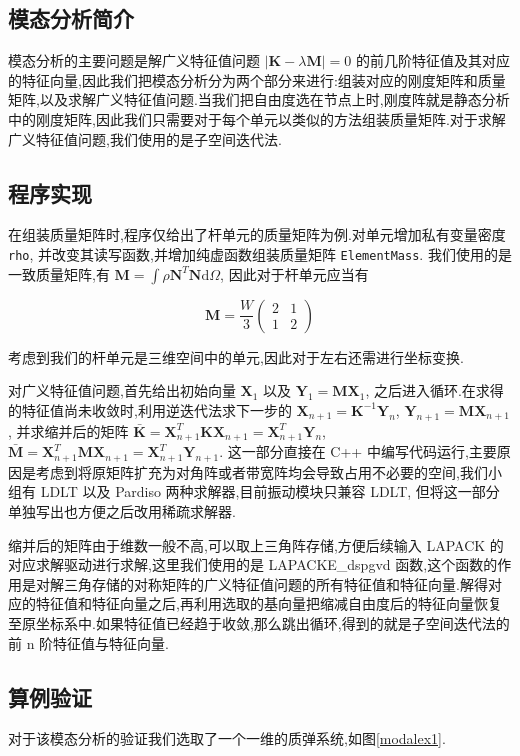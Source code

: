 
\subsection{模态分析简介}
模态分析的主要问题是解广义特征值问题 $|\mathbf{K}-\lambda\mathbf{M}|=0$ 的前几阶特征值及其对应的特征向量,因此我们把模态分析分为两个部分来进行:组装对应的刚度矩阵和质量矩阵,以及求解广义特征值问题.当我们把自由度选在节点上时,刚度阵就是静态分析中的刚度矩阵,因此我们只需要对于每个单元以类似的方法组装质量矩阵.对于求解广义特征值问题,我们使用的是子空间迭代法.
\subsection{程序实现}
在组装质量矩阵时,程序仅给出了杆单元的质量矩阵为例.对单元增加私有变量密度 \texttt{rho}, 并改变其读写函数,并增加纯虚函数组装质量矩阵 \texttt{ElementMass}. 我们使用的是一致质量矩阵,有 $\mathbf{M}=\int\rho\mathbf{N}^T\mathbf{N}\mathrm{d}\Omega$, 因此对于杆单元应当有

\[
\mathbf{M}=\frac{W}{3}\left(\begin{array}{cc} 2&1\\1&2 \end{array} \right)
\]

考虑到我们的杆单元是三维空间中的单元,因此对于左右还需进行坐标变换.

对广义特征值问题,首先给出初始向量 $\mathbf{X}_1$ 以及 $\mathbf{Y}_1=\mathbf{M}\mathbf{X}_1$, 之后进入循环.在求得的特征值尚未收敛时,利用逆迭代法求下一步的 $\mathbf{X}_{n+1}=\mathbf{K}^{-1}\mathbf{Y}_n$, $\mathbf{Y}_{n+1}=\mathbf{M}\mathbf{X}_{n+1}$, 并求缩并后的矩阵 $\bar{\mathbf{K}}=\mathbf{X}_{n+1}^T\mathbf{K}\mathbf{X}_{n+1}=\mathbf{X}_{n+1}^T\mathbf{Y}_n$,  $\bar{\mathbf{M}}=\mathbf{X}_{n+1}^T\mathbf{M}\mathbf{X}_{n+1}=\mathbf{X}_{n+1}^T\mathbf{Y}_{n+1}$. 这一部分直接在 C++ 中编写代码运行,主要原因是考虑到将原矩阵扩充为对角阵或者带宽阵均会导致占用不必要的空间,我们小组有 LDLT 以及 Pardiso 两种求解器,目前振动模块只兼容 LDLT, 但将这一部分单独写出也方便之后改用稀疏求解器.

缩并后的矩阵由于维数一般不高,可以取上三角阵存储,方便后续输入 LAPACK 的对应求解驱动进行求解,这里我们使用的是 LAPACKE\_dspgvd 函数,这个函数的作用是对解三角存储的对称矩阵的广义特征值问题的所有特征值和特征向量.解得对应的特征值和特征向量之后,再利用选取的基向量把缩减自由度后的特征向量恢复至原坐标系中.如果特征值已经趋于收敛,那么跳出循环,得到的就是子空间迭代法的前 n 阶特征值与特征向量.

\subsection{算例验证}
对于该模态分析的验证我们选取了一个一维的质弹系统,如图\ref{modalex1}.

